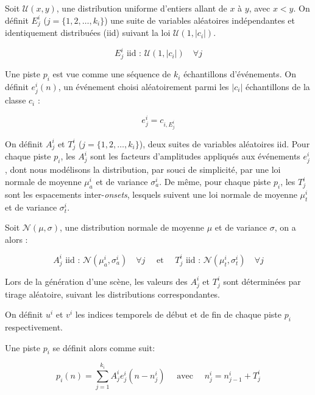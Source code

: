 Soit $\mathcal{U}(x,y)$, une distribution uniforme d'entiers allant de $x$ à $y$, avec $x<y$. On définit $E_j^i$ ($j=\lbrace 1,2,\ldots,k_i\rbrace$) une suite de variables aléatoires indépendantes et identiquement distribuées (iid) suivant la loi $\mathcal{U}(1,\vert c_i \vert)$.

\begin{equation}
E_j^i \textrm{ iid : } \mathcal{U}(1,\vert c_i \vert) \quad \forall j
\end{equation}

Une piste $p_i$ est vue comme une séquence de $k_i$ échantillons d'événements. On définit $e_j^i(n)$, un événement choisi aléatoirement parmi les $\vert c_i\vert$ échantillons de la classe $c_i$ :

\begin{equation}
e_j^i=c_{i,E_j^i}
\end{equation}

On définit $A^i_j$ et $T^i_j$ ($j=\lbrace 1,2,\ldots,k_i\rbrace$), deux suites de variables aléatoires iid. Pour chaque piste $p_i$, les $A^i_j$ sont les facteurs d'amplitudes appliqués aux événements $e_j^i$, dont nous modélisons la distribution, par souci de simplicité, par une loi normale de moyenne $\mu_a^i$ et de variance $\sigma_a^i$. De même, pour chaque piste $p_i$, les $T_j^i$ sont les espacements inter-\emph{onsets}, lesquels suivent une loi normale de moyenne $\mu_t^i$ et de variance $\sigma_t^i$.

Soit $\mathcal{N}(\mu,\sigma)$, une distribution normale de moyenne $\mu$ et de variance $\sigma$, on a alors :

\begin{equation}
\label{eq:ch4_eq1}
A_j^i \textrm{ iid : } \mathcal{N}(\mu_a^{i},\sigma_a^{i}) \quad \forall j \quad \textrm{ et } \quad T_j^i \textrm{ iid : } \mathcal{N}({\mu_t^{i},\sigma_t^{i}}) \quad \forall j
\end{equation}

Lors de la génération d'une scène, les valeurs des $A^i_j$ et $T_j^i$ sont déterminées par tirage aléatoire, suivant les distributions correspondantes.

On définit $u^i$ et $v^i$ les indices temporels de début et de fin de chaque piste $p_i$ respectivement.

Une piste $p_i$ se définit alors comme suit:

\begin{equation}
\label{eq:ch4_eq2}
p_{i}(n)= \sum_{j=1}^{k_i} A_j^i e_j^i(n-n_j^i) \quad \textrm{ avec } \quad n_j^i=n_{j-1}^i + T_j^i
\end{equation}


